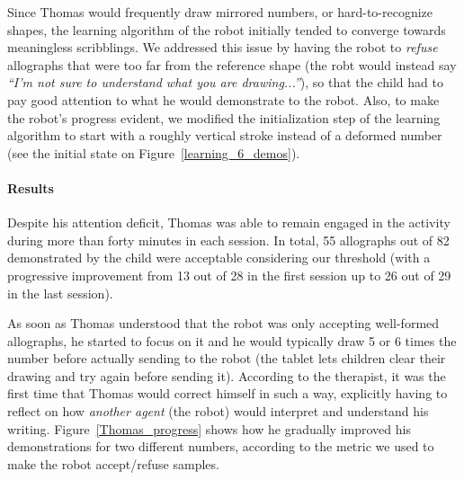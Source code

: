 \documentclass{article}
\begin{document}

Since Thomas would frequently draw mirrored numbers, or hard-to-recognize
shapes, the learning algorithm of the robot initially tended to converge towards
meaningless scribblings. We addressed this issue by having the robot to
\emph{refuse} allographs that were too far from the reference shape (the robt
would instead say \emph{``I'm
not sure to understand what you are drawing...''}), so that the child had to
pay good attention to what he would demonstrate to the robot. Also, to make
the robot's progress evident, we modified the initialization step of the
learning algorithm to start with a roughly vertical stroke instead of a
deformed number (see the initial state on Figure~\ref{learning_6_demos}).

%

\paragraph{Results}

Despite his attention deficit, Thomas was able to remain engaged in the activity during more than
forty minutes in each session. In total, 55 allographs out of 82 
demonstrated by the child were acceptable considering our threshold (with a
progressive improvement from 13 out of 28 in the first session up to 26 out
of 29 in the last session).

As soon as Thomas understood that the robot was only accepting well-formed
allographs, he started to focus on it and he would typically draw 5 or 6 times
the number before actually sending to the robot (the tablet lets children
clear their drawing and try again before sending it). According to
the therapist, it was the first time that Thomas would correct himself in such a
way, explicitly having to reflect on how \emph{another agent} (the robot) would
interpret and understand his writing. Figure~\ref{Thomas_progress} shows how
he gradually improved his demonstrations for two different numbers, according to the
metric we used to make the robot accept/refuse samples.
\end{document}
